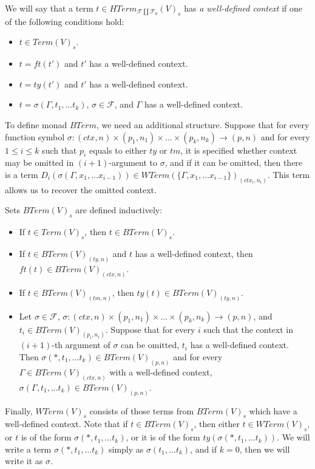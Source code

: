 \documentclass[reqno]{amsart}
\theoremstyle{definition}
\theoremstyle{remark}
\numberwithin{figure}{section}
\begin{document}
We will say that a term $t \in HTerm_{\mathcal{F} \amalg \mathcal{F}_0}(V)_s$ has \emph{a well-defined context} if one of the following conditions hold:
\begin{itemize}
\item $t \in Term(V)_s$.
\item $t = ft(t')$ and $t'$ has a well-defined context.
\item $t = ty(t')$ and $t'$ has a well-defined context.
\item $t = \sigma(\Gamma, t_1, \ldots t_k)$, $\sigma \in \mathcal{F}$, and $\Gamma$ has a well-defined context.
\end{itemize}

To define monad $BTerm$, we need an additional structure.
Suppose that for every function symbol $\sigma : (ctx,n) \times (p_1,n_1) \times \ldots \times (p_k,n_k) \to (p,n)$
    and for every $1 \leq i \leq k$ such that $p_i$ equals to either $ty$ or $tm$, it is specified whether context may be omitted in $(i+1)$-argument to $\sigma$,
    and if it can be omitted, then there is a term $D_i(\sigma(\Gamma, x_1, \ldots x_{i-1})) \in WTerm(\{ \Gamma, x_1, \ldots x_{i-1} \})_{(ctx_i,n_i)}$.
This term allows us to recover the omitted context.

Sets $BTerm(V)_s$ are defined inductively:
\begin{itemize}
\item If $t \in Term(V)_s$, then $t \in BTerm(V)_s$.
\item If $t \in BTerm(V)_{(ty,n)}$ and $t$ has a well-defined context, then $ft(t) \in BTerm(V)_{(ctx,n)}$.
\item If $t \in BTerm(V)_{(tm,n)}$, then $ty(t) \in BTerm(V)_{(ty,n)}$.
\item Let $\sigma \in \mathcal{F}$, $\sigma : (ctx,n) \times (p_1,n_1) \times \ldots \times (p_k,n_k) \to (p,n)$, and $t_i \in BTerm(V)_{(p_i,n_i)}$.
    Suppose that for every $i$ such that the context in $(i+1)$-th argument of $\sigma$ can be omitted, $t_i$ has a well-defined context.
    Then $\sigma(*, t_1, \ldots t_k) \in BTerm(V)_{(p,n)}$ and for every $\Gamma \in BTerm(V)_{(ctx,n)}$
        with a well-defined context, $\sigma(\Gamma, t_1, \ldots t_k) \in BTerm(V)_{(p,n)}$.
\end{itemize}

Finally, $WTerm(V)_s$ consists of those terms from $BTerm(V)_s$ which have a well-defined context.
Note that if $t \in BTerm(V)_s$, then either $t \in WTerm(V)_s$, or $t$ is of the form $\sigma(*, t_1, \ldots t_k)$, or it is of the form $ty(\sigma(*, t_1, \ldots t_k))$.
We will write a term $\sigma(*, t_1, \ldots t_k)$ simply as $\sigma(t_1, \ldots t_k)$, and if $k = 0$, then we will write it as $\sigma$.
\end{document}
